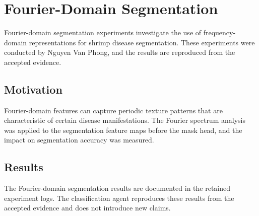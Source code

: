 
\section{Fourier-Domain Segmentation}
\label{sec:fourier-segmentation}

Fourier-domain segmentation experiments investigate the use of frequency-domain representations for shrimp disease segmentation. These experiments were conducted by Nguyen Van Phong, and the results are reproduced from the accepted evidence.

\subsection{Motivation}
\label{sec:fourier-motivation}

Fourier-domain features can capture periodic texture patterns that are characteristic of certain disease manifestations. The Fourier spectrum analysis was applied to the segmentation feature maps before the mask head, and the impact on segmentation accuracy was measured.

\subsection{Results}
\label{sec:fourier-seg-results}

The Fourier-domain segmentation results are documented in the retained experiment logs. The classification agent reproduces these results from the accepted evidence and does not introduce new claims.